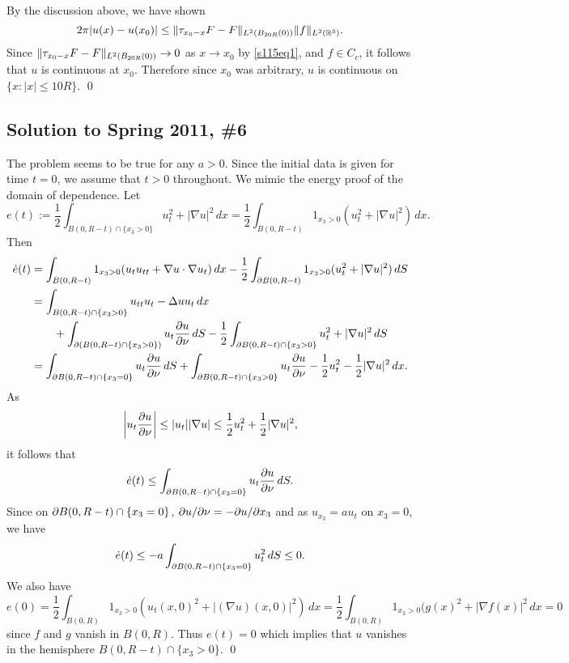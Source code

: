 By the discussion above, we have shown
$$2\pi|u(x) - u(x_{0})| \leq \| \tau_{x_{0} - x}F - F \|_{L^{2}(B_{20R}(0))}\| f \|_{L^{2}(\mathbb{R}^{3})}.$$
Since $\| \tau_{x_{0} - x}F - F \|_{L^{2}(B_{20R}(0))} \rightarrow 0$ as $x \rightarrow x_{0}$ by \eqref{s115eq1}, and $f \in C_{c}$, it follows
that $u$ is continuous at $x_{0}$. Therefore since $x_{0}$ was arbitrary, $u$ is continuous on $\{x: |x| \leq 10R\}$.
\hfill\qed

\subsection*{Solution to Spring 2011, \#6}\label{s116}
The problem seems to be true for any $a > 0$. Since the initial data is given for time $t = 0$, we assume that $t > 0$ throughout.
We mimic the energy proof of the domain of dependence.  Let
$$e(t) := \frac{1}{2}\int_{B(0, R - t) \cap \{x_{3} > 0\}}u_{t}^{2} + |\nabla u|^{2}\, dx = \frac{1}{2}\int_{B(0, R - t)}1_{x_{3} > 0}(u_{t}^{2} + |\nabla u|^{2})\, dx.$$
Then
\begin{align*}
\dot{e}(t) &= \int_{B(0, R - t)}1_{x_{3} > 0}(u_{t}u_{tt} + \nabla u \cdot \nabla u_{t})\, dx - \frac{1}{2}\int_{\partial B(0, R - t)}1_{x_{3} > 0}(u_{t}^{2} + |\nabla u|^{2})\, dS\\
& = \int_{B(0, R - t) \cap \{x_{3} > 0\}}u_{tt}u_{t} - \Delta u u_{t}\, dx\\
 &\quad\quad+ \int_{\partial(B(0, R - t) \cap \{x_{3} > 0\})}u_{t}\frac{\partial u}{\partial \nu}\, dS - \frac{1}{2}\int_{\partial B(0, R - t) \cap \{x_{3} > 0\}}u_{t}^{2} + |\nabla u|^{2}\, dS\\
&= \int_{\partial B(0, R - t) \cap \{x_{3} = 0\}}u_{t}\frac{\partial u}{\partial \nu}\, dS + \int_{\partial B(0, R - t) \cap \{x_{3} > 0\}}u_{t}\frac{\partial u}{\partial \nu} - \frac{1}{2}u_{t}^{2} - \frac{1}{2}|\nabla u|^{2}\, dx.
\end{align*}
As
\begin{align*}
\bigg|u_{t}\frac{\partial u}{\partial \nu}\bigg| \leq |u_{t}||\nabla u| \leq \frac{1}{2}u_{t}^{2} + \frac{1}{2}|\nabla u|^{2},
\end{align*}
it follows that
\begin{align*}
\dot{e}(t) \leq \int_{\partial B(0, R - t) \cap \{x_{3} = 0\}}u_{t}\frac{\partial u}{\partial \nu}\, dS.
\end{align*}
Since on $\partial B(0, R - t) \cap \{x_{3} = 0\}$, $\partial u/\partial \nu = -\partial u/\partial x_{3}$ and as $u_{x_{3}} = au_{t}$ on $x_{3} = 0$, we have
$$\dot{e}(t) \leq -a\int_{\partial B(0, R - t) \cap \{x_{3} = 0\}}u_{t}^{2}\, dS \leq 0.$$
We also have
$$e(0) = \frac{1}{2}\int_{B(0, R)}1_{x_{3} > 0}(u_{t}(x, 0)^{2} + |(\nabla u)(x, 0)|^{2})\, dx = \frac{1}{2}\int_{B(0, R)}1_{x_{3} > 0}(g(x)^{2} + |\nabla f(x)|^{2}\, dx = 0$$
since $f$ and $g$ vanish in $B(0, R)$.
Thus $e(t) = 0$ which implies that $u$ vanishes in the hemisphere $B(0, R - t) \cap \{x_{3} > 0\}$.
\hfill\qed

